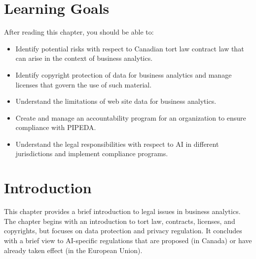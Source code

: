 %
%
\section*{Learning Goals}

After reading this chapter, you should be able to:
\begin{itemize}
    \item Identify potential risks with respect to Canadian tort law contract law that can arise in the context of business analytics.
    \item Identify copyright protection of data for business analytics and manage licenses that govern the use of such material. 
    \item Understand the limitations of web site data for business analytics.
    \item Create and manage an accountability program for an organization to ensure compliance with PIPEDA.
    \item Understand the legal responsibilities with respect to AI in different jurisdictions and implement compliance programs.
\end{itemize}

\section{Introduction}

This chapter provides a brief introduction to legal issues in business analytics. The chapter begins with an introduction to tort law, contracts, licenses, and copyrights, but focuses on data protection and privacy regulation. It concludes with a brief view to AI-specific regulations that are proposed (in Canada) or have already taken effect (in the European Union). 

